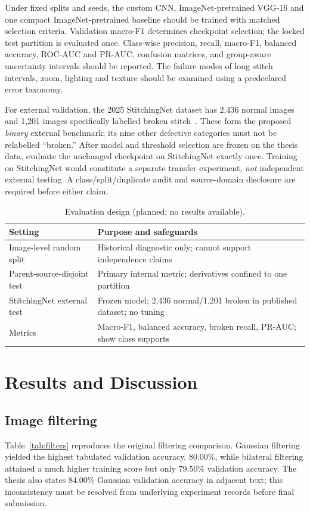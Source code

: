 \documentclass[conference,a4paper]{IEEEtran}
\begin{document}
Under fixed splits and seeds, the custom CNN, ImageNet-pretrained VGG-16 and one compact ImageNet-pretrained baseline should be trained with matched selection criteria. Validation macro-F1 determines checkpoint selection; the locked test partition is evaluated once. Class-wise precision, recall, macro-F1, balanced accuracy, ROC-AUC and PR-AUC, confusion matrices, and group-aware uncertainty intervals should be reported. The failure modes of long stitch intervals, zoom, lighting and texture should be examined using a predeclared error taxonomy.

For external validation, the 2025 StitchingNet dataset has 2,436 normal images and 1,201 images specifically labelled broken stitch~\cite{stitchingnet}. These form the proposed \emph{binary} external benchmark; its nine other defective categories must not be relabelled ``broken.'' After model and threshold selection are frozen on the thesis data, evaluate the unchanged checkpoint on StitchingNet exactly once. Training on StitchingNet would constitute a separate transfer experiment, \emph{not} independent external testing. A class/split/duplicate audit and source-domain disclosure are required before either claim.

\begin{table}[!t]\centering
\caption{Evaluation design (planned; no results available).}\label{tab:protocol}
\setlength{\tabcolsep}{3pt}\scriptsize
\begin{tabular}{p{}p{}}\toprule
Setting & Purpose and safeguards \\\midrule
Image-level random split & Historical diagnostic only; cannot support independence claims \\
Parent-source-disjoint test & Primary internal metric; derivatives confined to one partition \\
StitchingNet external test & Frozen model; 2,436 normal/1,201 broken in published dataset; no tuning \\
Metrics & Macro-F1, balanced accuracy, broken recall, PR-AUC; show class supports \\
\bottomrule\end{tabular}
\end{table}

\section{Results and Discussion}
\subsection{Image filtering}
Table~\ref{tab:filters} reproduces the original filtering comparison. Gaussian filtering yielded the highest tabulated validation accuracy, 80.00\%, while bilateral filtering attained a much higher training score but only 79.50\% validation accuracy. The thesis also states 84.00\% Gaussian validation accuracy in adjacent text; this inconsistency must be resolved from underlying experiment records before final submission.
\end{document}
